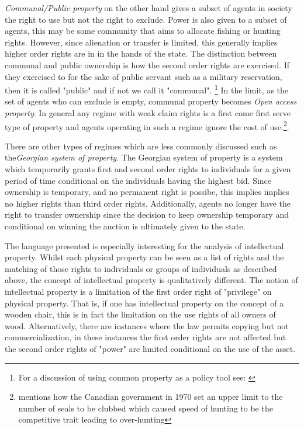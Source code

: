 \documentclass[12pt]{article}
\numberwithin{equation}{section}
\begin{document}
\textit{Communal/Public property} on the other hand gives a subset of agents in society the right to use but not the right to exclude. Power is also given to a subset of agents, this may be some community that aims to allocate fishing or hunting rights.
However, since alienation or transfer is limited, this generally implies higher order rights are in in the hands of the state. The distinction between communal and public ownership is how the second order rights are exercised. If they exercised to for the sake of public servant such as a military reservation, then it is called "public" and if not we call it "communal". \footnote{For a discussion of using common property as a policy tool see: \cite{ciriacy1975common}} In the limit, as the set of agents who can exclude is empty, communal property becomes \textit{Open access property}. In general any regime with weak claim rights is a first come first serve type of property and agents operating in such a regime ignore the cost of use.\footnote{\cite{Alchian1973} mentions how the Canadian government in 1970 set an upper limit to the number of seals to be clubbed which caused speed of hunting to be the competitive trait leading to over-hunting}.

There are other types of regimes which are less commonly discussed such as the\textit{Georgian system of property}. The Georgian system of property is a system which temporarily grants first and second order rights to individuals for a given period of time conditional on the individuals having the highest bid. Since ownership is temporary, and no permanent right is possibe, this implies implies no higher rights than third order rights. Additionally, agents no longer have the right to transfer ownership since the decision to keep ownership temporary and conditional on winning the auction is ultimately given to the state.

The language presented is especially interesting for the analysis of intellectual property. Whilst each physical property can be seen as a list of rights and the matching of those rights to individuals or groups of individuals as described above, the concept of intellectual property is qualitatively different. The notion of intellectual property is a limitation of the first order right of "privilege" on physical property. That is, if one has intellectual property on the concept of a wooden chair, this is in fact the limitation on the use rights of all owners of wood. Alternatively, there are instances where the law permits copying but not commercialization, in these instances the first order rights are not affected but the second order rights of "power" are limited conditional on the use of the asset.
\end{document}
